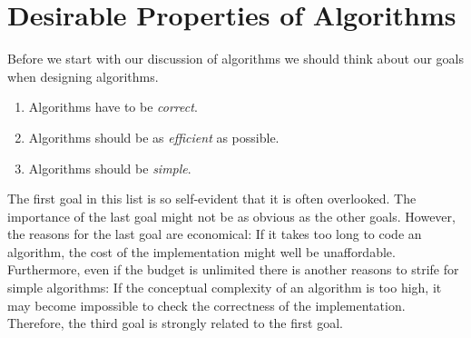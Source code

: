 \section{Desirable Properties of Algorithms}
Before we start with our discussion of algorithms we should think about our goals when designing
algorithms.  
\begin{enumerate}
\item Algorithms have to be \emph{correct}.
\item Algorithms should be as \emph{efficient} as possible.
\item Algorithms should be \emph{simple}.
\end{enumerate}
The first goal in this list is so self-evident that it is often overlooked.  The
importance of the last goal might not be as obvious as the other goals.
However, the reasons for the last goal are economical:  If it takes too long to code an algorithm, the
cost of the implementation might well be unaffordable.  Furthermore, even if the budget is unlimited there 
is another reasons to strife for simple algorithms:
If the conceptual complexity of an algorithm is too high, it may become impossible to check
the correctness of the implementation.  Therefore, the third goal is strongly related to the first
goal.  

